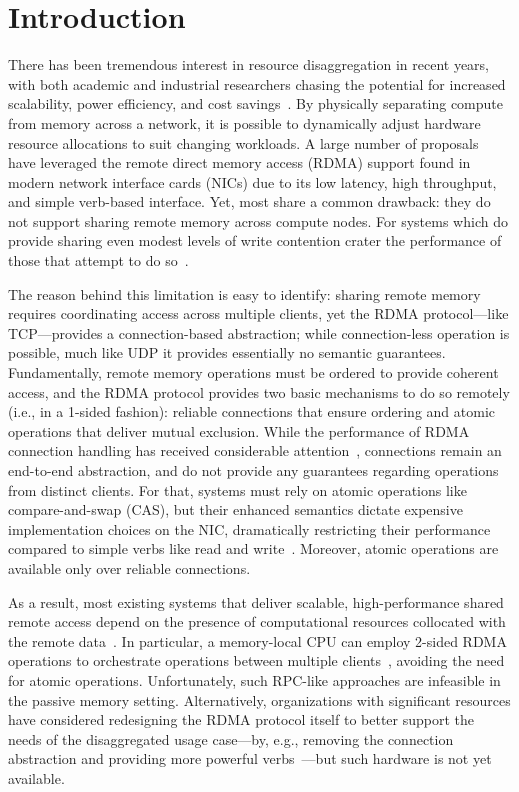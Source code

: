 \section{Introduction}

There has been tremendous interest in resource
disaggregation in recent years, with both academic and
industrial researchers chasing the potential for increased
scalability, power efficiency, and cost
savings~\cite{blade-server,rethinking,the-machine,requirements,clio-arxiv,firebox,leap,zombieland,storm,aifm,supernic}.
By physically separating compute from memory across a
network, it is possible to dynamically adjust hardware
resource allocations to suit changing workloads.  A large
number of
proposals~\cite{infiniswap,fastswap,legoos,clover,sherman,farm,reigons}
have leveraged the remote direct memory access (RDMA)
support found in modern network interface cards (NICs) due
to its low latency, high throughput, and simple verb-based
interface.  Yet, most share a common drawback: they do not
support sharing remote memory across compute nodes.  For
systems which do provide sharing even modest levels of write
contention crater the performance of those that attempt to
do so~\cite{clover,sherman}.

The reason behind this limitation is easy to identify: sharing remote
memory requires coordinating access across multiple clients, yet the
RDMA protocol---like TCP---provides a connection-based abstraction;
while connection-less operation is possible, much like UDP it provides
essentially no semantic guarantees.  Fundamentally, remote memory
operations must be ordered to provide coherent access, and the RDMA
protocol provides two basic mechanisms to do so remotely (i.e., in a
1-sided fashion): reliable connections that ensure ordering and atomic
operations that deliver mutual exclusion.  While the performance of
RDMA connection handling has received considerable attention~\cite{farm,storm,scalerpc},
connections remain an end-to-end abstraction, and do not provide any
guarantees regarding operations from distinct clients.  For that,
systems must rely on atomic operations like compare-and-swap (CAS),
but their enhanced semantics dictate expensive implementation choices
on the NIC, dramatically restricting their performance compared to
simple verbs like read and write~\cite{design-guidelines}.  Moreover,
atomic operations are available only over reliable connections.

As a result, most existing systems that deliver scalable,
high-performance shared remote access depend on the presence of
computational resources collocated with the remote
data~\cite{herd,cell,farm,pilaf,storm}.  In particular, a
memory-local CPU can employ 2-sided RDMA operations to orchestrate
operations between multiple clients~\cite{herd,fasst}, avoiding the need
for atomic operations.  Unfortunately, such RPC-like approaches are
infeasible in the passive memory setting.  Alternatively,
organizations with significant resources have considered redesigning
the RDMA protocol itself to better support the needs of the
disaggregated usage case---by, e.g., removing the connection
abstraction and providing more powerful verbs~\cite{filemr,rma,star}---but such
hardware is not yet available.

